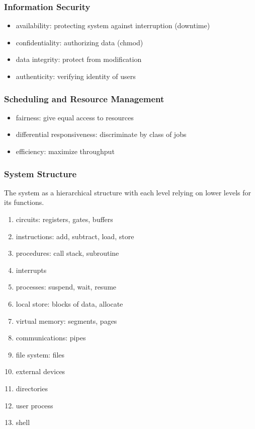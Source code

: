 \documentclass[]{article}
\theoremstyle{definition}
\begin{document}
			\subsubsection{Information Security}
				\begin{itemize}
					\item availability:	protecting system against interruption (downtime)
					\item confidentiality: 	authorizing data (chmod)
					\item data integrity:	protect from modification
					\item authenticity:	verifying identity of users 
				\end{itemize}
			\subsubsection{Scheduling and Resource Management}
				\begin{itemize}
					\item fairness:	give equal access to resources
					\item differential responsiveness:	discriminate by class of jobs
					\item efficiency:	maximize throughput
				\end{itemize}
			\subsubsection{System Structure}
				The system as a hierarchical structure with each level relying on lower levels for its functions.
				\begin{enumerate}
					\item circuits:	registers, gates, buffers
					\item instructions: add, subtract, load, store
					\item procedures: 	call stack, subroutine
					\item interrupts
					\item processes:	suspend, wait, resume
					\item local store:	blocks of data, allocate
					\item virtual memory:	segments, pages
					\item communications:	pipes
					\item file system:	files 
					\item external devices
					\item directories
					\item user process
					\item shell	 
				\end{enumerate}
\end{document}
